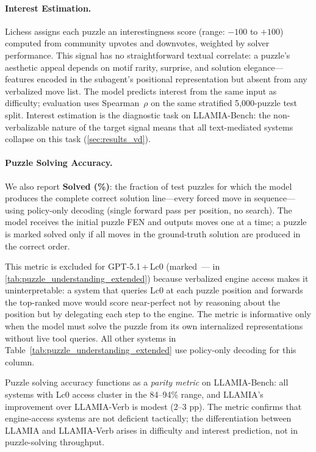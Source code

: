 \paragraph{Interest Estimation.}
\label{sec:app_bench_puzzle_int}
Lichess assigns each puzzle an interestingness score (range: $-100$ to $+100$) computed from community upvotes and downvotes, weighted by solver performance. This signal has no straightforward textual correlate: a puzzle's aesthetic appeal depends on motif rarity, surprise, and solution elegance---features encoded in the subagent's positional representation but absent from any verbalized move list. The model predicts interest from the same input as difficulty; evaluation uses Spearman~$\rho$ on the same stratified 5,000-puzzle test split. Interest estimation is the diagnostic task on LLAMIA-Bench: the non-verbalizable nature of the target signal means that all text-mediated systems collapse on this task (\cref{sec:results_vd}).

\paragraph{Puzzle Solving Accuracy.}
\label{sec:app_bench_puzzle_solve}
We also report \textbf{Solved (\%)}: the fraction of test puzzles for which the model produces the complete correct solution line---every forced move in sequence---using policy-only decoding (single forward pass per position, no search). The model receives the initial puzzle FEN and outputs moves one at a time; a puzzle is marked solved only if all moves in the ground-truth solution are produced in the correct order.

This metric is excluded for GPT-5.1\,+\,Lc0 (marked~--- in \cref{tab:puzzle_understanding_extended}) because verbalized engine access makes it uninterpretable: a system that queries Lc0 at each puzzle position and forwards the top-ranked move would score near-perfect not by reasoning about the position but by delegating each step to the engine. The metric is informative only when the model must solve the puzzle from its own internalized representations without live tool queries. All other systems in Table~\ref{tab:puzzle_understanding_extended} use policy-only decoding for this column.

Puzzle solving accuracy functions as a \emph{parity metric} on LLAMIA-Bench: all systems with Lc0 access cluster in the 84--94\% range, and LLAMIA's improvement over LLAMIA-Verb is modest (2--3 pp). The metric confirms that engine-access systems are not deficient tactically; the differentiation between LLAMIA and LLAMIA-Verb arises in difficulty and interest prediction, not in puzzle-solving throughput.

